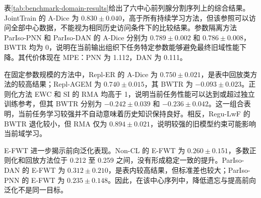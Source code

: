 表\ref{tab:benchmark-domain-results}给出了六中心前列腺分割序列上的综合结果。JointTrain 的 A-Dice 为 $0.830\pm0.040$，高于所有持续学习方法，但该参照可以访问全部中心数据，不能视为相同历史访问条件下的比较结果。参数隔离方法 ParIso-PNN 和 ParIso-DAN 的 A-Dice 分别为 $0.789\pm0.002$ 和 $0.786\pm0.008$，BWTR 均为 0，说明在当前输出组织下任务特定参数能够避免最终旧域性能下降。其代价体现在 MPE：PNN 为 1.112，DAN 为 0.111。

在固定参数规模的方法中，Repl-ER 的 A-Dice 为 $0.750\pm0.021$，是表中回放类方法的较高结果；Repl-AGEM 为 $0.740\pm0.015$，其 BWTR 为 $-0.093\pm0.023$。正则化方法 EWC 和 SI 的 RMA 均高于 1，说明当前任务性能可以达到或超过独立训练参考，但其 BWTR 分别为 $-0.242\pm0.039$ 和 $-0.236\pm0.042$。这一组合表明，当前任务学习较强并不自动意味着历史知识保持良好。相反，Regu-LwF 的 BWTR 退化较小，但 RMA 仅为 $0.894\pm0.021$，说明较强的旧模型约束可能影响当前域学习。

E-FWT 进一步揭示前向泛化表现。Non-CL 的 E-FWT 为 $0.260\pm0.151$，多数正则化和回放方法位于 0.212 至 0.259 之间，没有形成稳定一致的提升。ParIso-DAN 的 E-FWT 为 $0.312\pm0.210$，是表内较高结果，但标准差也较大；ParIso-PNN 的 E-FWT 为 $0.235\pm0.148$。因此，在该中心序列中，降低遗忘与提高前向泛化不是同一目标。

